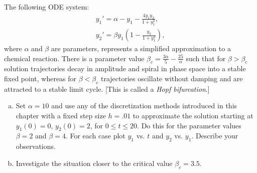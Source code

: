 \begin{problem}[A\&P 3.3]
  The following ODE system:
  \begin{align*}
    y_1' = \alpha - y_1 - \frac{4y_1 y_2}{1 + y_1^2}, \\
    y_2' = \beta y_1 \left(1 - \frac{y_2}{1 + y_1^2}\right),
  \end{align*}
  where $\alpha$ and $\beta$ are parameters, represents a simplified approximation to a chemical reaction. There is a parameter value $\beta_c = \frac{3\alpha}{5} - \frac{25}{\alpha}$ such that for $\beta > \beta_c$ solution trajectories decay in amplitude and spiral in phase space into a stable fixed point, whereas for $\beta < \beta_c$ trajectories oscillate without damping and are attracted to a stable limit cycle. [This is called a \emph{Hopf bifurcation}.]
  \begin{enumerate}[(a)]
    \item Set $\alpha = 10$ and use any of the discretization methods introduced in this chapter with a fixed step size $h = .01$ to approximate the solution starting at $y_1(0) = 0$, $y_2(0) = 2$, for $0 \leq t \leq 20$. Do this for the parameter values $\beta = 2$ and $\beta = 4$. For each case plot $y_1$ vs. $t$ and $y_2$ vs. $y_1$. Describe your observations.
    \item Investigate the situation closer to the critical value $\beta_c = 3.5$.
  \end{enumerate}
\end{problem}

